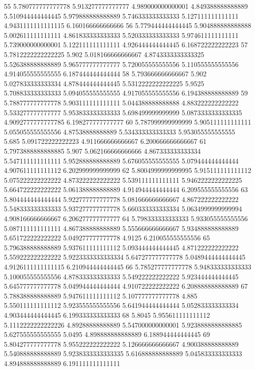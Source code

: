 55 5.780777777777778 5.913277777777777 4.989000000000001 4.849388888888889 5.510944444444445 5.979888888888889 5.746333333333333 5.127111111111111 4.9431111111111115 6.160166666666666
56 5.779444444444445 5.904888888888888 5.002611111111111 4.861833333333333 5.520333333333333 5.974611111111111 5.739000000000001 5.122111111111111 4.926444444444445 6.168722222222223
57 5.7812222222222225 5.902 5.018166666666667 4.8743333333333325 5.526388888888889 5.965777777777777 5.720055555555556 5.110555555555556 4.914055555555555 6.187444444444444
58 5.793666666666667 5.902 5.027833333333334 4.878444444444445 5.5312222222222225 5.9525 5.708833333333333 5.094055555555555 4.917055555555556 6.194388888888889
59 5.788777777777778 5.903111111111111 5.044388888888888 4.883222222222222 5.533277777777777 5.953833333333333 5.698499999999999 5.0873333333333335 4.9092777777777785 6.198277777777777
60 5.787999999999999 5.905111111111111 5.055055555555556 4.87538888888889 5.534333333333333 5.953055555555555 5.685 5.091722222222223 4.911666666666667 6.200666666666667
61 5.7973888888888885 5.907 5.062166666666666 4.867333333333334 5.547111111111111 5.952888888888889 5.676055555555555 5.079444444444444 4.907611111111112 6.202999999999999
62 5.8004999999999995 5.915111111111112 5.075222222222222 4.873222222222222 5.539111111111111 5.9462222222222225 5.664722222222222 5.061388888888889 4.914944444444444 6.209555555555556
63 5.804444444444444 5.922777777777778 5.081666666666667 4.867222222222222 5.548333333333333 5.937277777777778 5.660333333333334 5.0634999999999994 4.908166666666667 6.206277777777777
64 5.798333333333333 5.933055555555556 5.087111111111111 4.867388888888889 5.555666666666667 5.934888888888889 5.651722222222222 5.049277777777778 4.9125 6.210055555555556
65 5.796388888888889 5.937611111111112 5.093444444444445 4.871222222222222 5.559222222222222 5.9223333333333334 5.647277777777778 5.0489444444444445 4.9126111111111115 6.210944444444445
66 5.785277777777778 5.948333333333333 5.100055555555556 4.878333333333333 5.549222222222222 5.923444444444445 5.645777777777778 5.049944444444444 4.910722222222222 6.208888888888889
67 5.788388888888889 5.947611111111112 5.107777777777778 4.885 5.550111111111112 5.923555555555556 5.641944444444444 5.052833333333334 4.903444444444445 6.199333333333333
68 5.8045 5.955611111111112 5.1112222222222226 4.89288888888889 5.547000000000001 5.9238888888888885 5.627555555555555 5.0495 4.898888888888889 6.188944444444445
69 5.804277777777778 5.955222222222222 5.126666666666667 4.900388888888889 5.540888888888889 5.9238333333333335 5.616888888888889 5.045833333333333 4.894888888888889 6.191111111111111
